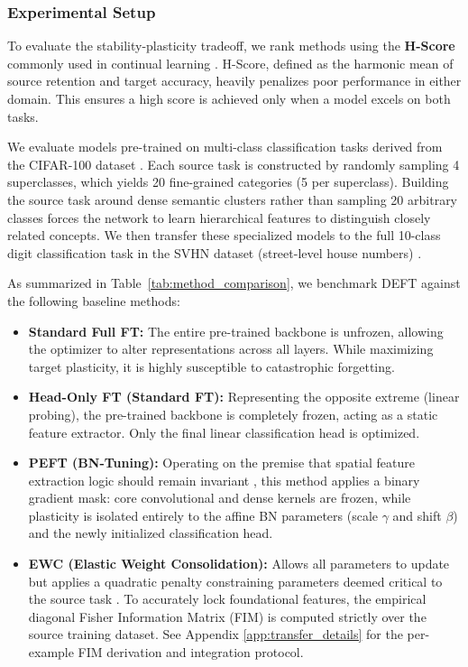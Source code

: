 \documentclass[11pt, a4paper, copyright, gdm]{google}
\theoremstyle{definition}
\begin{document}
\subsubsection{Experimental Setup}

To evaluate the stability-plasticity tradeoff, we rank methods using the \textbf{H-Score} commonly used in continual learning \cite{qiu2024continual, xie2025adadare, islam2025latest}. H-Score, defined as the harmonic mean of source retention and target accuracy, heavily penalizes poor performance in either domain. This ensures a high score is achieved only when a model excels on both tasks.

We evaluate models pre-trained on multi-class classification tasks derived from the CIFAR-100 dataset \cite{krizhevsky2009learning}. Each source task is constructed by randomly sampling 4 superclasses, which yields 20 fine-grained categories (5 per superclass). Building the source task around dense semantic clusters rather than sampling 20 arbitrary classes forces the network to learn hierarchical features to distinguish closely related concepts. We then transfer these specialized models to the full 10-class digit classification task in the SVHN dataset (street-level house numbers) \cite{netzer2011reading}.

As summarized in Table~\ref{tab:method_comparison}, we benchmark DEFT against the following baseline methods:
\begin{itemize}
    \item \textbf{Standard Full FT:} The entire pre-trained backbone is unfrozen, allowing the optimizer to alter representations across all layers. While maximizing target plasticity, it is highly susceptible to catastrophic forgetting.
    \item \textbf{Head-Only FT (Standard FT):} Representing the opposite extreme (linear probing), the pre-trained backbone is completely frozen, acting as a static feature extractor. Only the final linear classification head is optimized.
    \item \textbf{PEFT (BN-Tuning):} Operating on the premise that spatial feature extraction logic should remain invariant \cite{frankle2020training}, this method applies a binary gradient mask: core convolutional and dense kernels are frozen, while plasticity is isolated entirely to the affine BN parameters (scale $\gamma$ and shift $\beta$) and the newly initialized classification head.
    \item \textbf{EWC (Elastic Weight Consolidation):} Allows all parameters to update but applies a quadratic penalty constraining parameters deemed critical to the source task \cite{kirkpatrick2017overcoming}. To accurately lock foundational features, the empirical diagonal Fisher Information Matrix (FIM) is computed strictly over the source training dataset. See Appendix \ref{app:transfer_details} for the per-example FIM derivation and integration protocol.
\end{itemize}
\end{document}
